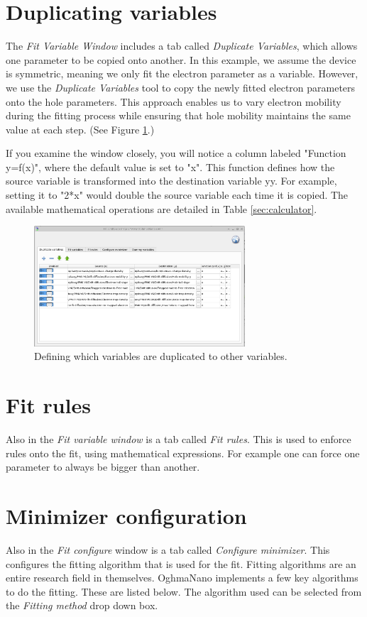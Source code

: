 \section{Duplicating variables}
The \emph{Fit Variable Window} includes a tab called \emph{Duplicate Variables}, which allows one parameter to be copied onto another. In this example, we assume the device is symmetric, meaning we only fit the electron parameter as a variable. However, we use the \emph{Duplicate Variables} tool to copy the newly fitted electron parameters onto the hole parameters. This approach enables us to vary electron mobility during the fitting process while ensuring that hole mobility maintains the same value at each step. (See Figure \ref{fig:fit_duplicate_vars}.)

If you examine the window closely, you will notice a column labeled "Function y=f(x)", where the default value is set to "x". This function defines how the source variable is transformed into the destination variable yy. For example, setting it to "2*x" would double the source variable each time it is copied. The available mathematical operations are detailed in Table \ref{sec:calculator}.

\begin{figure}[H]
\centering
\includegraphics[width=0.7\textwidth]{./images/fit/fit_duplicate_vars.png}
\caption{Defining which variables are duplicated to other variables.}
\label{fig:fit_duplicate_vars}
\end{figure}


\section{Fit rules}
Also in the \emph{Fit variable window} is a tab called \emph{Fit rules}. This is used to enforce rules onto the fit, using mathematical expressions. For example one can force one parameter to always be bigger than another.

\section{Minimizer configuration}
Also in the \emph{Fit configure} window is a tab called \emph{Configure minimizer}. This configures the fitting algorithm that is used for the fit. Fitting algorithms are an entire research field in themselves. OghmaNano implements a few key algorithms to do the fitting. These are listed below. The algorithm used can be selected from the \emph{Fitting method} drop down box.
  
